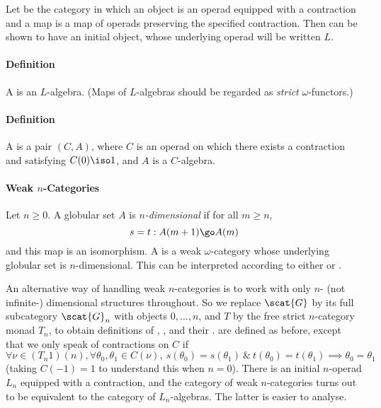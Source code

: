 Let  be the category in which an object is an operad equipped with a
contraction and a map is a map of operads preserving the specified
contraction.  Then  can be shown to have an initial object, whose
underlying operad will be written $L$.




\paragraph{Definition } 

A  is an $L$-algebra.  (Maps of
$L$-algebras should be regarded as \emph{strict} $\omega$-functors.)

\paragraph{Definition }

A  is a pair $(C,A)$, where $C$ is an operad on
which there exists a contraction and satisfying $C(0) \iso 1$, and $A$ is a
$C$-algebra.

\paragraph{Weak $n$-Categories}

Let $n\geq 0$.  A globular set $A$ is \emph{$n$-dimensional} if for all
$m\geq n$,
\[
s=t: A(m+1) \go A(m)
\]
and this map is an isomorphism.  A  is a weak
$\omega$-category whose underlying globular set is $n$-dimensional.  This can
be interpreted according to either  or .


\clearpage





An alternative way of handling weak $n$-categories is to work with only $n$-
(not infinite-) dimensional structures throughout.  So we replace $\scat{G}$
by its full subcategory $\scat{G}_n$ with objects $0, \ldots, n$, and $T$ by
the free strict $n$-category monad $T_n$, to obtain definitions of
, , and their .
 are defined as before, except that we only speak of
contractions on $C$ if
%
\begin{equation}	\label{eq:n-contr-l}
\forall \nu \in (T_n 1)(n), \forall \theta_0, \theta_1 \in C(\nu), \ 
s(\theta_0) = s(\theta_1) \ \&\ t(\theta_0) = t(\theta_1) \implies 
\theta_0 = \theta_1
\end{equation}
%
(taking $C(-1)=1$ to understand this when $n=0$).  There is an initial
$n$-operad $L_n$ equipped with a contraction, and the category of weak
$n$-categories turns out to be equivalent to the category of $L_n$-algebras.
The latter is easier to analyse.

